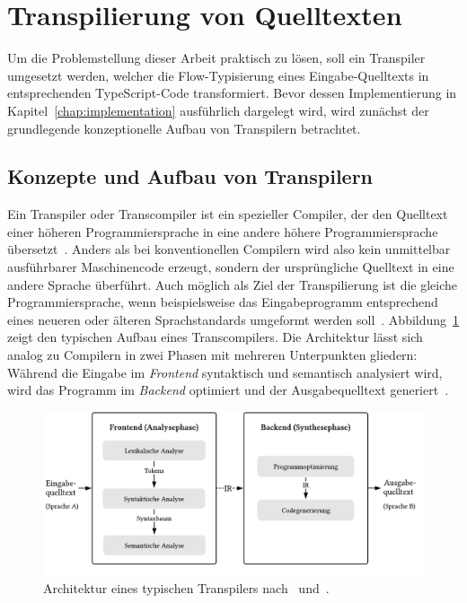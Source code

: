 \section{Transpilierung von Quelltexten}
\label{sec:transpilers}

Um die Problemstellung dieser Arbeit praktisch zu lösen, soll ein Transpiler umgesetzt werden, welcher die Flow-Typisierung eines Eingabe-Quelltexts in entsprechenden TypeScript-Code transformiert. Bevor dessen Implementierung in Kapitel~\ref{chap:implementation} ausführlich dargelegt wird, wird zunächst der grundlegende konzeptionelle Aufbau von Transpilern betrachtet.

\subsection{Konzepte und Aufbau von Transpilern}

Ein Transpiler oder Transcompiler ist ein spezieller Compiler, der den Quelltext einer höheren Programmiersprache in eine andere höhere Programmiersprache übersetzt~\autocite[3]{AHO:COMPILERS}. Anders als bei konventionellen Compilern wird also kein unmittelbar ausführbarer Maschinencode erzeugt, sondern der ursprüngliche Quelltext in eine andere Sprache überführt. Auch möglich als Ziel der Transpilierung ist die gleiche Programmiersprache, wenn beispielsweise das Eingabeprogramm entsprechend eines neueren oder älteren Sprachstandards umgeformt werden soll~\autocite{EVGENIY:2016}.
Abbildung~\ref{fig:transpiler-architecture} zeigt den typischen Aufbau eines Transcompilers. Die Architektur lässt sich analog zu Compilern in zwei Phasen mit mehreren Unterpunkten gliedern: Während die Eingabe im \emph{Frontend} syntaktisch und semantisch analysiert wird, wird das Programm im \emph{Backend} optimiert und der Ausgabequelltext generiert~\autocite[136]{APPEL:2003}.

\bigbreak
\begin{figure}[htb]
  \includegraphics[width=\textwidth]{src/2_Grundlagen/fig/transpiler-architecture.pdf}
  \caption{Architektur eines typischen Transpilers nach~\autocite{EVGENIY:2016} und~\autocite[8]{TORCZON:2007}.}
	\label{fig:transpiler-architecture}
\end{figure}

